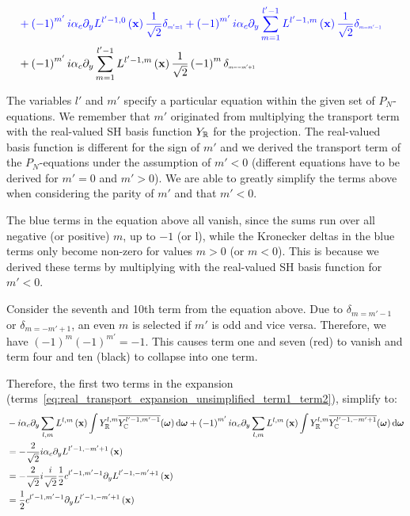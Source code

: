 \begin{align*}
\\&
\mathcolor{blue}
{
+
\left({-1}\right)^{m'}i
}
\mathcolor{blue}
{
\alpha_c\partial_y
L^{l'-1,0}\left (\vec{x}\right)
\frac{1}{\sqrt{2}}
\delta_{\scaleto{m'=1}{4pt}}
}
\mathcolor{blue}
{
+
\left({-1}\right)^{m'}i
}
\mathcolor{blue}
{
\alpha_c\partial_y
\sum_{m=1}^{l'-1}L^{l'-1,m}\left (\vec{x}\right)
\frac{1}{\sqrt{2}}
\delta_{\scaleto{m=m'-1}{4pt}}
}
\\&
\mathcolor{black}
{
+
\left({-1}\right)^{m'}i
}
\mathcolor{black}
{
\alpha_c\partial_y
\sum_{m=1}^{l'-1}L^{l'-1,m}\left (\vec{x}\right)
\frac{1}{\sqrt{2}}
\left({-1}\right)^{m}
\delta_{\scaleto{m=-m'+1}{4pt}}
}
\end{align*}

The variables $l'$ and $m'$ specify a particular equation within the given set of $P_N$-equations. We remember that $m'$ originated from multiplying the transport term with the real-valued SH basis function $Y_{\mathbb{R}}$ for the projection. The real-valued basis function is different for the sign of $m'$ and we derived the transport term of the $P_N$-equations under the assumption of $m'<0$ (different equations have to be derived for $m'=0$ and $m'>0$). We are able to greatly simplify the terms above when considering the parity of $m'$ and that $m'<0$.

The blue terms in the equation above all vanish, since the sums run over all negative (or positive) $m$, up to $-1$ (or l), while the Kronecker deltas in the blue terms only become non-zero for values $m>0$ (or $m<0$). This is because we derived these terms by multiplying with the real-valued SH basis function for $m'<0$.

Consider the seventh and 10th term from the equation above. Due to $\delta_{m=m'-1}$ or $\delta_{m=-m'+1}$, an even $m$ is selected if $m'$ is odd and vice versa. Therefore, we have $(-1)^m(-1)^{m'}=-1$. This causes term one and seven (red) to vanish and term four and ten (black) to collapse into one term.

Therefore, the first two terms in the expansion (terms~\ref{eq:real_transport_expansion_unsimplified_term1_term2}), simplify to:
\begin{align*}
&-i\alpha_c\partial_y\sum_{l,m}L^{l,m}\left (\boldsymbol{\mathbf{x}}\right)\int{Y_{\mathbb{R}}^{l,m}\overline{Y_{\mathbb{C}}^{l'-1, m'-1}}(\boldsymbol{\mathbf{\omega}} )\,\mathrm{d}\boldsymbol{\mathbf{\omega}}}
+\left({-1}\right)^{m'}i\alpha_c\partial_y\sum_{l,m}L^{l,m}\left (\boldsymbol{\mathbf{x}}\right)\int{Y_{\mathbb{R}}^{l,m}\overline{Y_{\mathbb{C}}^{l'-1, -m'+1}}(\boldsymbol{\mathbf{\omega}} )\,\mathrm{d}\boldsymbol{\mathbf{\omega}}}
\\
&=-\frac{2}{\sqrt{2}}i
\alpha_c\partial_y
L^{l'-1,-m'+1}\left (\boldsymbol{\mathbf{x}}\right)
\\
&=-\frac{2}{\sqrt{2}}i
\frac{i}{\sqrt{2}}\frac{1}{2}c^{{l'-1,m'-1}}
\partial_y
L^{l'-1,-m'+1}\left (\boldsymbol{\mathbf{x}}\right)
\\
&=
\frac{1}{2}c^{{l'-1,m'-1}}
\partial_y
L^{l'-1,-m'+1}\left (\boldsymbol{\mathbf{x}}\right)
\end{align*}

